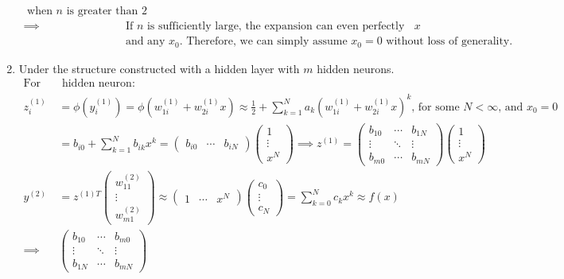 \documentclass[12pt]{article}
\begin{document}
\begin{enumerate}
\begin{align*}
		\text{ when $n$ is greater than 2} \\
		\implies &\text{If $n$ is sufficiently large, the expansion can even perfectly fit the closed form curve for any $x$ } \\
		&\text{and any $x_0$. Therefore, we can simply assume $x_0 = 0$ without loss of generality.}
	\end{align*}
	\item Under the structure constructed with a hidden layer with $m$ hidden neurons.
	\begin{align*}
		\text{For every} &\text{ hidden neuron: } \\
		z^{(1)}_i &= \phi(y^{(1)}_i) = \phi(w^{(1)}_{1i} + w^{(1)}_{2i}x) \approx 
		\frac{1}{2} + \displaystyle\sum_{k=1}^{N} a_k (w^{(1)}_{1i} + w^{(1)}_{2i}x)^{k} \text{, for some } N < \infty \text{, and $x_0 = 0$} \\
		&= b_{i0} + \sum_{k=1}^N b_{ik} x^{k} = \begin{pmatrix}b_{i0} & \cdots &b_{iN}\end{pmatrix} 
		\begin{pmatrix}1 \\ \vdots \\ x^N\end{pmatrix}
		\implies z^{(1)} = \begin{pmatrix}b_{10} & \cdots & b_{1N} \\ \vdots & \ddots & \vdots \\ b_{m0} & \cdots & b_{mN}\end{pmatrix}
		\begin{pmatrix}1 \\ \vdots \\ x^N\end{pmatrix} \\
		y^{(2)} &= z^{(1)T} \begin{pmatrix}w^{(2)}_{11} \\ \vdots \\ w^{(2)}_{m1}\end{pmatrix} \approx 
		\begin{pmatrix}1 & \cdots & x^N\end{pmatrix}
		\begin{pmatrix}c_0 \\ \vdots \\ c_N\end{pmatrix} = \sum_{k=0}^N c_k x^k \approx f(x)\\
		\implies &\begin{pmatrix}b_{10} & \cdots & b_{m0} \\ \vdots & \ddots & \vdots \\ b_{1N} & \cdots & b_{mN}\end{pmatrix}

\end{align*}
\end{enumerate}
\end{document}
